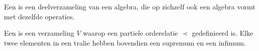 \documentclass[main.tex]{subfiles}
\begin{document}
\begin{de}
  Een  is een deelverzameling van een algebra, die op zichzelf ook een algebra vormt met dezelfde operaties.
\end{de}

\begin{de}
  Een  is een verzameling $V$ waarop een partiele orderelatie $\prec$ gedefinieerd is.
  Elke twee elementen in een tralie hebben bovendien een supremum en een infimum.
\end{de}
\end{document}
